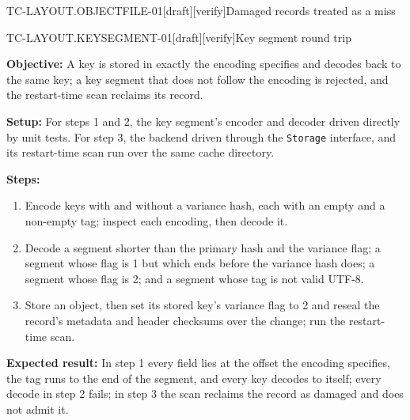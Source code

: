 \begin{requirement}{TC-LAYOUT.OBJECTFILE-01}[draft][verify]{Damaged records treated as a miss}


\end{requirement}

\begin{requirement}{TC-LAYOUT.KEYSEGMENT-01}[draft][verify]{Key segment round trip}


  \textbf{Objective:} A key is stored in exactly the encoding
   specifies and decodes back to the same
  key; a key segment that does not follow the encoding is rejected, and the
  restart-time scan reclaims its record.

  \textbf{Setup:} For steps 1 and 2, the key segment's encoder and decoder
  driven directly by unit tests. For step 3, the backend driven through the
  \texttt{Storage} interface, and its restart-time scan run over the same
  cache directory.

  \textbf{Steps:}
  \begin{enumerate}
    \item Encode keys with and without a variance hash, each with an empty
      and a non-empty tag; inspect each encoding, then decode it.
    \item Decode a segment shorter than the primary hash and the variance
      flag; a segment whose flag is 1 but which ends before the variance hash
      does; a segment whose flag is 2; and a segment whose tag is not valid
      UTF-8.
    \item Store an object, then set its stored key's variance flag to 2 and
      reseal the record's metadata and header checksums over the change; run
      the restart-time scan.
  \end{enumerate}

  \textbf{Expected result:} In step 1 every field lies at the offset the
  encoding specifies, the tag runs to the end of the segment, and every key
  decodes to itself; every decode in step 2 fails; in step 3 the scan
  reclaims the record as damaged and does not admit it.



\end{requirement}

